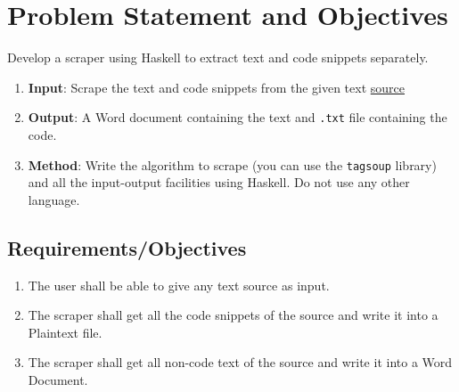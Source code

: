 \documentclass[12pt]{scrreprt}
\begin{document}
\chapter{Problem Statement and Objectives}
\begin{tcolorbox}[colback=white,colframe=gray,title={Assigned Project Statement}]
    Develop a scraper using Haskell to extract text and code snippets separately.
    \begin{enumerate}
        \item \textbf{Input}: Scrape the text and code snippets from the given text \href{https://eli.thegreenplace.net/2018/type-erasure-and-reification/}{source}
        \item \textbf{Output}: A Word document containing the text and \texttt{.txt} file containing the code.
        \item \textbf{Method}: Write the algorithm to scrape (you can use the \texttt{tagsoup} library) and all the input-output facilities using Haskell. Do not use any other language.
    \end{enumerate}
\end{tcolorbox}




\section{Requirements/Objectives}

\begin{enumerate}
    \item The user shall be able to give any text source as input.
    \item The scraper shall get all the code snippets of the source and write it into a Plaintext file.
    \item The scraper shall get all non-code text of the source and write it into a Word Document.
\end{enumerate}
\end{document}
